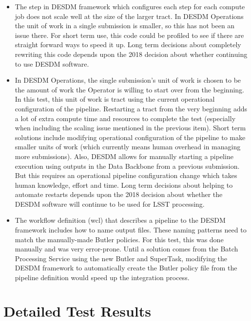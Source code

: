 \documentclass[DM,lsstdraft,STR,toc]{lsstdoc}
\begin{document}
\begin{itemize}
  \item{
    The step in DESDM framework which configures each step for each compute job does not scale well at the size of the larger tract.
    In DESDM Operations the unit of work in a single submission is smaller, so this has not been an issue there.
    For short term use, this code could be profiled to see if there are straight forward ways to speed it up.
    Long term decisions about completely rewriting this code depends upon the 2018 decision about whether continuing to use DESDM software.
  }

  \item{
    In DESDM Operations, the single submission's unit of work is chosen to be the amount of work the Operator is willing to start over from the beginning.
    In this test, this unit of work is tract using the current operational configuration of the pipeline.
    Restarting a tract from the very beginning adds a lot of extra compute time and resources to complete the test (especially when including the scaling issue
mentioned in the previous item).
    Short term solutions include modifying operational configuration of the pipeline to make smaller units of work (which currently means human overhead in managing more submissions).
    Also, DESDM allows for manually starting a pipeline execution using outputs in the Data Backbone from a previous submission.
    But this requires an operational pipeline configuration change which takes human knowledge, effort and time.
    Long term decisions about helping to automate restarts depends upon the 2018 decision about whether the DESDM software will continue to be used for LSST processing.
  }

  \item{
    The workflow definition (wcl) that describes a pipeline to the DESDM framework includes how to name output files.
    These naming patterns need to match the manually-made Butler policies.
    For this test, this was done manually and was very error-prone.
    Until a solution comes from the Batch Processing Service using the new Butler and SuperTask, modifying the DESDM framework to automatically create the Butler policy file from the pipeline definition would speed up the integration process.
  }

\end{itemize}

\newpage

\section{Detailed Test Results}
\label{sect:detailed}
\end{document}
